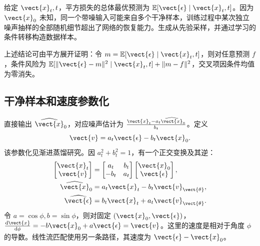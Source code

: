 \documentclass[../textbook.tex]{subfiles}
\begin{document}
\begin{note}[均方误差目标下的条件期望解与随机细节恢复边界]
给定 $\vect{x}_t,t$，平方损失的总体最优预测为 $\mathbb E[\vect{\epsilon}\mid \vect{x}_t,t]$。因为 $\vect{x}_0$ 未知，同一个带噪输入可能来自多个干净样本，训练过程中某次独立噪声抽样的全部随机细节超出了网络的恢复能力。生成从先验采样，并通过学习的条件转移构造数据样本。
\end{note}

上述结论可由平方展开证明：令 $m=\mathbb E[\vect{\epsilon}\mid \vect{x}_t,t]$，则对任意预测 $f$，条件风险为 $\mathbb E[\|\vect{\epsilon}-m\|^2\mid \vect{x}_t,t]+\|m-f\|^2$，交叉项因条件均值为零消失。

\subsection{干净样本和速度参数化}
直接输出 $\widehat{\vect{x}}_0$，对应噪声估计为 $\frac{\vect{x}_t-a_t\widehat{\vect{x}}_0}{b_t}$。定义
\begin{equation}
 \vect{v}=a_t\vect{\epsilon}-b_t\vect{x}_0.
\end{equation}
该参数化见渐进蒸馏研究\cite{salimans2022progressive}。因 $a_t^2+b_t^2=1$，有一个正交变换及其逆：
\begin{equation}
 \begin{aligned}
  \begin{bmatrix}\vect{x}_t\\\vect{v}\end{bmatrix}&=
  \begin{bmatrix}a_t&b_t\\-b_t&a_t\end{bmatrix}
  \begin{bmatrix}\vect{x}_0\\\vect{\epsilon}\end{bmatrix},\\
  \widehat{\vect{x}}_0&=a_t\vect{x}_t-b_t\vect{v}_{\vect{\theta}},\\
  \widehat{\vect{\epsilon}}&=b_t\vect{x}_t+a_t\vect{v}_{\vect{\theta}}.
 \end{aligned}
\end{equation}
令 $a=\cos\phi,b=\sin\phi$，则对固定 $(\vect{x}_0,\vect{\epsilon})$，$\frac{\mathrm d\vect{x}}{\mathrm d\phi}=-b\vect{x}_0+a\vect{\epsilon}=\vect{v}$。这里的速度是相对于角度 $\phi$ 的导数。线性流匹配使用另一条路径，其速度为 $\vect{\epsilon}-\vect{x}_0$。
\end{document}
